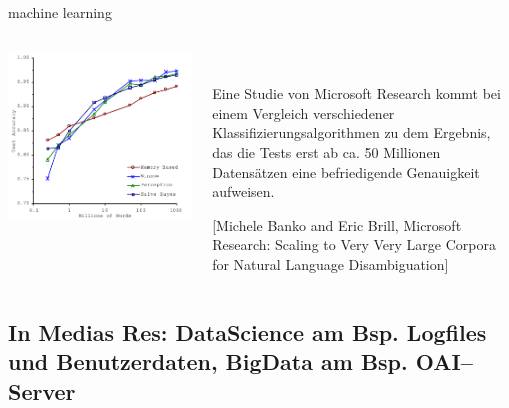\begin{frame}[fragile]{machine learning}
  \selectfont
  \begin{columns}[t,onlytextwidth]
    \begin{column}{0.5\textwidth}
      \begin{center}
        \includegraphics[width=1\textwidth]{pics/wann_effektiv}
      \end{center}
    \end{column}
    \begin{column}{0.5\textwidth}
      \\
      \medskip

      Eine Studie von Microsoft Research kommt bei einem Vergleich verschiedener Klassifizierungsalgorithmen zu dem Ergebnis, das die Tests erst ab ca. 50 Millionen Datensätzen eine befriedigende Genauigkeit aufweisen.
      \bigskip
      
      \footnotesize{[Michele Banko and Eric Brill, Microsoft Research: Scaling to Very Very Large Corpora for Natural Language Disambiguation]}
    \end{column}
  \end{columns}
\end{frame}

\subsection{In Medias Res: DataScience am Bsp. Logfiles und
Benutzerdaten, BigData am Bsp. OAI--Server}

